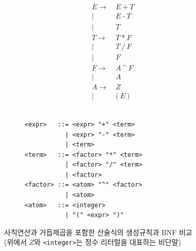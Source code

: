 \documentclass[b5paper,chapter,figtabcapt]{oblivoir}
\begin{document}
\begin{figure}[H]\vspace*{-4ex}
\hfill
\begin{subfigure}[b]{.2\linewidth}\addtolength{\jot}{-.3em}
\begin{align*}
E \to~& E ~\texttt{+}~ T \\
 \mid~& E ~\texttt{-}~ T \\
 \mid~& T \\
T \to~& T ~\texttt{*}~ F \\
 \mid~& T ~\texttt{/}~ F \\
 \mid~& F \\
F \to~& A ~\texttt{\char`^}~ F \\
 \mid~& A \\
A \to~& Z \\
 \mid~& \texttt{(}~ E ~\texttt{)}
\end{align*}
~\vspace*{-2.8ex}
\end{subfigure}
\qquad\qquad
\begin{subfigure}[b]{.6\linewidth}
\begin{lstlisting}
<expr>   ::= <expr> "+" <term>
           | <expr> "-" <term>
           | <term>
<term>   ::= <factor> "*" <term>
           | <factor> "/" <term>
           | <factor>
<factor> ::= <atom> "^" <factor>
           | <atom>
<atom>   ::= <integer>
           | "(" <expr> ")"
\end{lstlisting}
\end{subfigure}
\caption{사칙연산과 거듭제곱을 포함한 산술식의 생성규칙과 BNF 비교\\
         {\small(위에서 $Z$와 \texttt{<integer>}는 정수 리터럴을 대표하는 비단말)}
         \label{fig:BNF}}
\end{figure}
\end{document}
